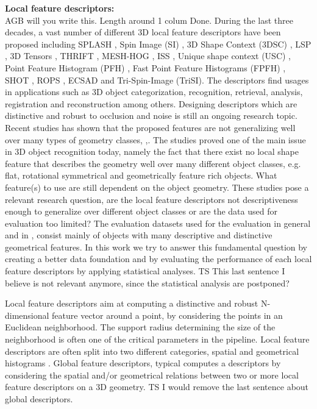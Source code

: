 \documentclass[10pt,twocolumn,letterpaper]{article}
\begin{document}
\textbf{Local feature descriptors:}\\
{\color{red} AGB will you write this. Length around 1 colum} {\color{blue} Done.}
During the last three decades, a vast number of different 3D local feature descriptors have been proposed including SPLASH \cite{Stein1992}, Spin Image (SI) \cite{Johnson1999}, 3D Shape Context (3DSC) \cite{Frome2004}, LSP \cite{ChenBhanu2004}, 3D Tensors \cite{Mian2006}, THRIFT \cite{Flint2007}, MESH-HOG \cite{Zaharescu2009}, ISS \cite{Zhong2009}, Unique shape context (USC) \cite{usc2010}, Point Feature Histogram (PFH) \cite{Rusu2008}, Fast Point Feature Histograms (FPFH) \cite{Fpfh2009}, SHOT \cite{Tombari2010}, ROPS \cite{Guo2013}, ECSAD \cite{Ecsad2015} and Tri-Spin-Image (TriSI)\cite{Guo2015}. The descriptors find usages in applications such as 3D object categorization, recognition, retrieval, analysis, registration and reconstruction among others. Designing descriptors which are distinctive and robust to occlusion and noise is still an ongoing research topic. Recent studies has shown that the proposed features are not generalizing well over many types of geometry classes, \cite{Guo2015},\cite{Buch2016}. The studies proved one of the main issue in 3D object recognition today, namely the fact that there exist no local shape feature that describes the geometry well over many different object classes, e.g. flat, rotational symmetrical and geometrically feature rich objects. What feature(s) to use are still dependent on the object geometry. These studies pose a relevant research question, are the local feature descriptors not descriptiveness enough to generalize over different object classes or are the data used for evaluation too limited? The evaluation datasets used for the evaluation in general and in \cite{Guo2015},\cite{Buch2016} consist mainly of objects with many descriptive and distinctive geometrical features. In this work we try to answer this fundamental question by creating a better data foundation and by evaluating the performance of each local feature descriptors by applying statistical analyses.
{\color{blue} TS This last sentence I believe is not relevant anymore, since the statistical analysis are postponed?}

Local feature descriptors aim at computing a distinctive and robust N-dimensional feature vector around a point, by considering the points in an Euclidean neighborhood. The support radius determining the size of the neighborhood is often one of the critical parameters in the pipeline. Local feature descriptors are often split into two different categories, spatial and geometrical histograms \cite{Salti2014}. Global feature descriptors, typical computes a descriptors by considering the spatial and/or geometrical relations between two or more local feature descriptors on a 3D geometry. {\color{blue} TS I would remove the last sentence about global descriptors.}
\end{document}
